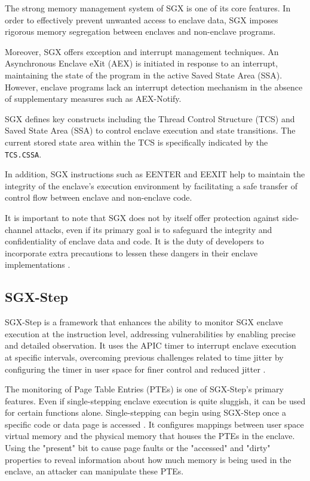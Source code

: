 \documentclass{llncs}
\begin{document}
The strong memory management system of SGX is one of its core features. In order to effectively prevent unwanted access to enclave data, SGX imposes rigorous memory segregation between enclaves and non-enclave programs.

Moreover, SGX offers exception and interrupt management techniques. An Asynchronous Enclave eXit (AEX) is initiated in response to an interrupt, maintaining the state of the program in the active Saved State Area (SSA). However, enclave programs lack an interrupt detection mechanism in the absence of supplementary measures such as AEX-Notify.

SGX defines key constructs including the Thread Control Structure (TCS) and Saved State Area (SSA) to control enclave execution and state transitions. The current stored state area within the TCS is specifically indicated by the \texttt{TCS.CSSA}.

In addition, SGX instructions such as EENTER and EEXIT help to maintain the integrity of the enclave's execution environment by facilitating a safe transfer of control flow between enclave and non-enclave code.

It is important to note that SGX does not by itself offer protection against side-channel attacks, even if its primary goal is to safeguard the integrity and confidentiality of enclave data and code. It is the duty of developers to incorporate extra precautions to lessen these dangers in their enclave implementations \cite{CostanD16}.
\subsection{SGX-Step}
SGX-Step \cite{BulckPS17} is a framework that enhances the ability to monitor SGX enclave execution at the instruction level, addressing vulnerabilities by enabling precise and detailed observation. It uses the APIC timer to interrupt enclave execution at specific intervals, overcoming previous challenges related to time jitter by configuring the timer in user space for finer control and reduced jitter \cite{ArnautovTGKMPLM16}.

The monitoring of Page Table Entries (PTEs) is one of SGX-Step's primary features. Even if single-stepping enclave execution is quite sluggish, it can be used for certain functions alone. Single-stepping can begin using SGX-Step once a specific code or data page is accessed \cite{BulckWKPS17}. It configures mappings between user space virtual memory and the physical memory that houses the PTEs in the enclave. Using the "present" bit to cause page faults \cite{XuCP15} or the "accessed" and "dirty" properties to reveal information about how much memory is being used in the enclave, an attacker can manipulate these PTEs.
\end{document}
